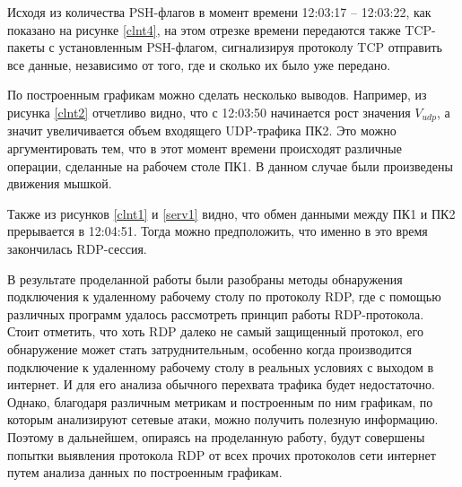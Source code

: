 \documentclass[bachelor, och, coursework]{SCWorks}
\begin{document}
  Исходя из количества PSH-флагов в момент времени 12:03:17 -- 12:03:22, как показано на рисунке \ref{clnt4}, на этом отрезке
  времени передаются также TCP-пакеты с установленным PSH-флагом, сигнализируя протоколу TCP отправить все данные, независимо
  от того, где и сколько их было уже передано.

  По построенным графикам можно сделать несколько выводов.
  Например, из рисунка \ref{clnt2} отчетливо видно, что с 12:03:50 начинается рост значения $V_{udp}$, а значит
  увеличивается объем входящего UDP-трафика ПК2. Это можно аргументировать тем, что в этот момент времени происходят
  различные операции, сделанные на рабочем столе ПК1. В данном случае были произведены движения мышкой.

  Также из рисунков \ref{clnt1} и \ref{serv1} видно, что обмен данными между ПК1 и ПК2 прерывается в 12:04:51. Тогда можно
  предположить, что именно в это время закончилась RDP-сессия.
  
  
  \conclusion
  
  В результате проделанной работы были разобраны методы обнаружения подключения к удаленному рабочему столу по протоколу RDP, где с помощью различных программ
  удалось рассмотреть принцип работы RDP-протокола. Стоит отметить, что хоть RDP далеко не самый защищенный протокол, его обнаружение может стать затруднительным,
  особенно когда производится подключение к удаленному рабочему столу в реальных условиях с выходом в интернет. И для его анализа обычного перехвата трафика будет
  недостаточно. Однако, благодаря различным метрикам и построенным по ним графикам, по которым анализируют сетевые атаки, можно получить полезную информацию. 
  Поэтому в дальнейшем, опираясь на проделанную работу, будут совершены попытки выявления протокола RDP от всех прочих протоколов сети интернет 
  путем анализа данных по построенным графикам.
  
\end{document}
